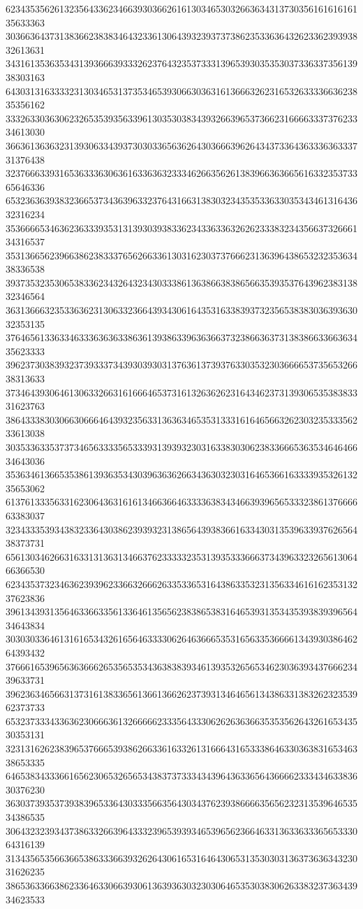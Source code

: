 62343535626132356433623466393036626161303465303266363431373035616161616135633363
30366364373138366238383464323361306439323937373862353363643262336239393832613631
34316135363534313936663933326237643235373331396539303535303733633735613938303163
64303131633332313034653137353465393066303631613666326231653263333663623835356162
33326330363062326535393563396130353038343932663965373662316666333737623334613030
36636136363231393063343937303033656362643036663962643437336436333636333731376438
32376663393165363336306361633636323334626635626138396636366561633235373365646336
65323636393832366537343639633237643166313830323435353363303534346131643632316234
35366665346362363339353131393039383362343363363262623338323435663732666134316537
35313665623966386238333765626633613031623037376662313639643865323235363438336538
39373532353065383362343264323430333861363866383865663539353764396238313832346564
36313666323533636231306332366439343061643531633839373235653838303639363032353135
37646561336334633363636338636139386339636366373238663637313838663366363435623333
39623730383932373933373439303930313763613739376330353230366665373565326638313633
37346439306461306332663161666465373161326362623164346237313930653538383331623763
38643338303066306664643932356331363634653531333161646566326230323533356233613038
30353363353737346563333565333931393932303163383030623833666536353464646634643036
35363461366535386139363534303963636266343630323031646536616333393532613235653062
61376133356331623064363161613466366463333638343466393965653332386137666663383037
32343335393438323364303862393932313865643938366163343031353963393762656438373731
65613034626631633131363134663762333332353139353336663734396332326561306466366530
62343537323463623939623366326662633533653164386335323135633461616235313237623836
39613439313564633663356133646135656238386538316465393135343539383939656434643834
30303033646131616534326165646333306264636665353165633536666134393038646264393432
37666165396563636662653565353436383839346139353265653462303639343766623439633731
39623634656631373161383365613661366262373931346465613438633138326232353962373733
65323733343363623066636132666662333564333062626363663535356264326165343530353131
32313162623839653766653938626633616332613166643165333864633036383165346338653335
64653834333661656230653265653438373733343439643633656436666233343463383630376230
36303739353739383965336430333566356430343762393866663565623231353964653534386535
30643232393437386332663964333239653939346539656236646331363363336565333064316139
31343565356636653863336639326264306165316464306531353030313637363634323031626235
38653633663862336463306639306136393630323030646535303830626338323736343934623533
